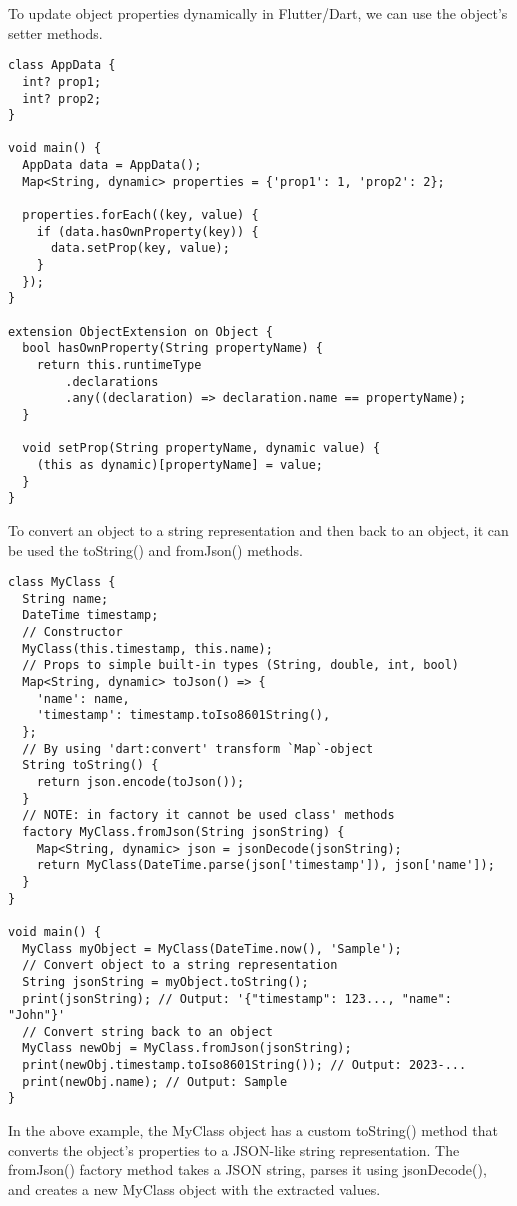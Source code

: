 To update object properties dynamically in Flutter/Dart, we can use the object's setter methods.

\begin{lstlisting}
class AppData {
  int? prop1;
  int? prop2;
}

void main() {
  AppData data = AppData();
  Map<String, dynamic> properties = {'prop1': 1, 'prop2': 2};

  properties.forEach((key, value) {
    if (data.hasOwnProperty(key)) {
      data.setProp(key, value);
    }
  });
}

extension ObjectExtension on Object {
  bool hasOwnProperty(String propertyName) {
    return this.runtimeType
        .declarations
        .any((declaration) => declaration.name == propertyName);
  }

  void setProp(String propertyName, dynamic value) {
    (this as dynamic)[propertyName] = value;
  }
}
\end{lstlisting}

To convert an object to a string representation and then back to an object, it can be used the toString() 
and fromJson() methods. 

\begin{lstlisting}
class MyClass {
  String name;
  DateTime timestamp;
  // Constructor
  MyClass(this.timestamp, this.name);
  // Props to simple built-in types (String, double, int, bool)
  Map<String, dynamic> toJson() => {
    'name': name,
    'timestamp': timestamp.toIso8601String(),
  };
  // By using 'dart:convert' transform `Map`-object
  String toString() {
    return json.encode(toJson());
  }
  // NOTE: in factory it cannot be used class' methods
  factory MyClass.fromJson(String jsonString) {
    Map<String, dynamic> json = jsonDecode(jsonString);
    return MyClass(DateTime.parse(json['timestamp']), json['name']);
  }
}

void main() {
  MyClass myObject = MyClass(DateTime.now(), 'Sample');
  // Convert object to a string representation
  String jsonString = myObject.toString();
  print(jsonString); // Output: '{"timestamp": 123..., "name": "John"}'
  // Convert string back to an object
  MyClass newObj = MyClass.fromJson(jsonString);
  print(newObj.timestamp.toIso8601String()); // Output: 2023-...
  print(newObj.name); // Output: Sample
}
\end{lstlisting}

In the above example, the MyClass object has a custom toString() method that converts the object's properties to a 
JSON-like string representation. The fromJson() factory method takes a JSON string, parses it using jsonDecode(), 
and creates a new MyClass object with the extracted values.


